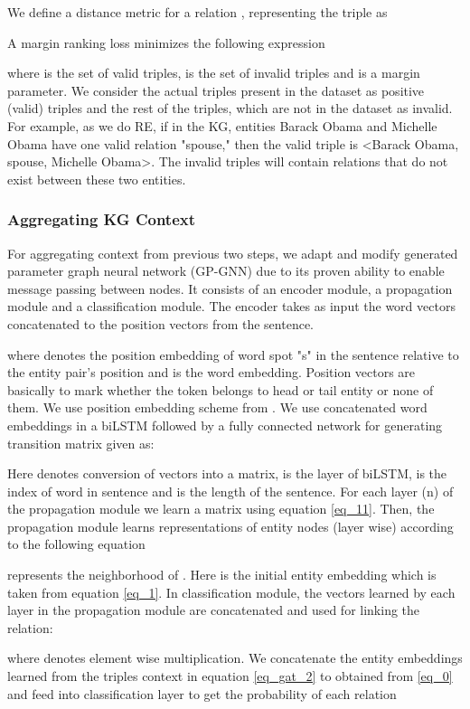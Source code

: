 \documentclass[sigconf]{acmart}
\begin{document}
We define a distance metric  for a relation , representing the triple  as

A margin ranking loss minimizes the following expression

where  is the set of valid triples,  is the set of invalid triples and  is a margin parameter. We consider the actual triples present in the dataset as positive (valid) triples and the rest of the triples, which are not in the dataset as invalid. For example, as we do RE, if in the KG, entities Barack Obama and Michelle Obama have one valid relation "spouse," then the valid triple is <Barack Obama, spouse, Michelle Obama>. The invalid triples will contain relations that do not exist between these two entities.
\subsubsection{Aggregating KG Context} \label{sec:aggre}
For aggregating context from previous two steps, we adapt and modify generated parameter graph neural network (GP-GNN) \cite{DBLP:conf/acl/ZhuLLFCS19} due to its proven ability to enable message passing between nodes. It consists of an encoder module, a propagation module and a classification module. The encoder takes as input the word vectors concatenated to the position vectors from the sentence.


where  denotes the position embedding of word spot "s" in the sentence relative to the entity pair's position  and  is the word embedding. Position vectors are basically to mark whether the token belongs to head or tail entity or none of them. We use position embedding scheme from \cite{DBLP:conf/acl/ZhuLLFCS19}. We use concatenated word embeddings in a biLSTM followed by a fully connected network for generating transition matrix given as:

Here  denotes conversion of vectors into a matrix,  is the layer of biLSTM,  is the index of word in sentence and  is the length of the sentence. For each layer (n) of the propagation module we learn a matrix  using equation \ref{eq_11}. Then, the propagation module learns representations of entity nodes  (layer wise) according to the following equation

 represents the neighborhood of .
Here  is the initial entity embedding which is taken from equation \ref{eq_1}. In classification module, the vectors learned by each layer in the propagation module are concatenated and used for linking the relation:

where  denotes element wise multiplication. 
We concatenate the entity embeddings learned from the triples context in equation \ref{eq_gat_2} to  obtained from \ref{eq_0} and feed into classification layer to get the probability of each relation
\end{document}
